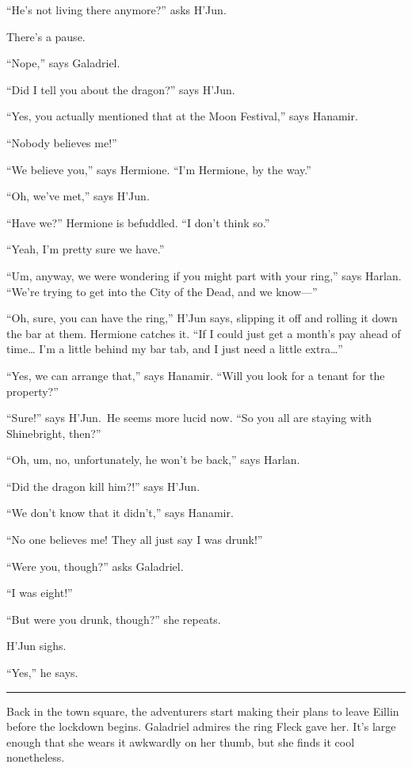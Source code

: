 \documentclass[smalldemyvopaper,11pt,twoside,onecolumn,openright,extrafontsizes]{memoir}
\begin{document}
``He's not living there anymore?'' asks H'Jun.

There's a pause.

``Nope,'' says Galadriel.

``Did I tell you about the dragon?'' says H'Jun.

``Yes, you actually mentioned that at the Moon Festival,'' says Hanamir.

``Nobody believes me!''

``We believe you,'' says Hermione. ``I'm Hermione, by the way.''

``Oh, we've met,'' says H'Jun.

``Have we?'' Hermione is befuddled. ``I don't think so.''

``Yeah, I'm pretty sure we have.''

``Um, anyway, we were wondering if you might part with your ring,'' says
Harlan. ``We're trying to get into the City of the Dead, and we
know---''

``Oh, sure, you can have the ring,'' H'Jun says, slipping it off and
rolling it down the bar at them. Hermione catches it. ``If I could just
get a month's pay ahead of time\ldots{} I'm a little behind my bar tab,
and I just need a little extra\ldots{}''

``Yes, we can arrange that,'' says Hanamir. ``Will you look for a tenant
for the property?''

``Sure!'' says H'Jun.~He seems more lucid now. ``So you all are staying
with Shinebright, then?''

``Oh, um, no, unfortunately, he won't be back,'' says Harlan.

``Did the dragon kill him?!'' says H'Jun.

``We don't know that it didn't,'' says Hanamir.

``No one believes me! They all just say I was drunk!''

``Were you, though?'' asks Galadriel.

``I was eight!''

``But were you drunk, though?'' she repeats.

H'Jun sighs.

``Yes,'' he says.

\begin{center}\rule{0.5\linewidth}{\linethickness}\end{center}

Back in the town square, the adventurers start making their plans to
leave Eillin before the lockdown begins. Galadriel admires the ring
Fleck gave her. It's large enough that she wears it awkwardly on her
thumb, but she finds it cool nonetheless.
\end{document}
